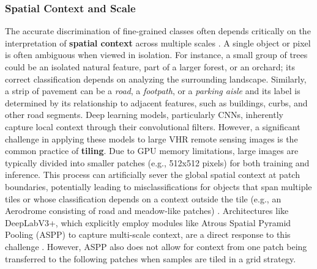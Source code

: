 \documentclass{report}
\begin{document}
\subsubsection{Spatial Context and Scale}
The accurate discrimination of fine-grained classes often depends critically on the interpretation of \textbf{spatial context} across multiple scales \parencites[p.~313]{KotaridisLazaridouRemotesensingimagesegmentationadvancesmetaanalysis2021a}. A single object or pixel is often ambiguous when viewed in isolation. For instance, a small group of trees could be an isolated natural feature, part of a larger forest, or an orchard; its correct classification depends on analyzing the surrounding landscape. Similarly, a strip of pavement can be a \textit{road}, a \textit{footpath}, or a \textit{parking aisle} and its label is determined by its relationship to adjacent features, such as buildings, curbs, and other road segments.
Deep learning models, particularly CNNs, inherently capture local context through their convolutional filters. However, a significant challenge in applying these models to large VHR remote sensing images is the common practice of \textbf{tiling}. Due to GPU memory limitations, large images are typically divided into smaller patches (e.g., 512x512 pixels) for both training and inference. This process can artificially sever the global spatial context at patch boundaries, potentially leading to misclassifications for objects that span multiple tiles or whose classification depends on a context outside the tile (e.g., an Aerodrome consisting of road and meadow-like patches) \parencites[p.~313]{KotaridisLazaridouRemotesensingimagesegmentationadvancesmetaanalysis2021a}. Architectures like DeepLabV3+, which explicitly employ modules like Atrous Spatial Pyramid Pooling (ASPP) to capture multi-scale context, are a direct response to this challenge \parencite[p.~8]{SertelEtAlLandUseLandCoverMappingUsingDeepLearningBasedSegmentationApproachesVHRWorldview3Images2022}. However, ASPP also does not allow for context from one patch being transferred to the following patches when samples are tiled in a grid strategy.
\end{document}
